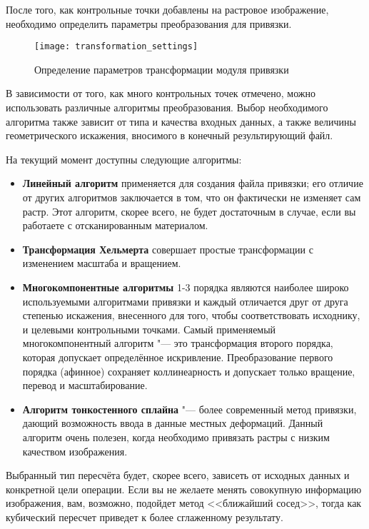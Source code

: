 После того, как контрольные точки добавлены на растровое изображение,
необходимо определить параметры преобразования для привязки.

\begin{figure}[ht]
\centering
  \texttt{[image: transformation\_settings]}
  \caption{Определение параметров трансформации модуля привязки \wincaption}\label{fig:georef_transform}
\end{figure}


В зависимости от того, как много контрольных точек отмечено, можно
использовать различные алгоритмы преобразования. Выбор необходимого
алгоритма также зависит от типа и качества входных данных, а также
величины геометрического искажения, вносимого в конечный результирующий
файл.

На текущий момент доступны следующие алгоритмы:

\begin{itemize}[label=--]
\item \textbf{Линейный алгоритм} применяется для создания файла
привязки; его отличие от других алгоритмов заключается в том, что он
фактически не изменяет сам растр. Этот алгоритм, скорее всего, не будет
достаточным в случае, если вы работаете с отсканированным материалом.
\item \textbf{Трансформация Хельмерта} совершает простые трансформации
с изменением масштаба и вращением.
\item \textbf{Многокомпонентные алгоритмы} 1-3 порядка являются
наиболее широко используемыми алгоритмами привязки и каждый отличается
друг от друга степенью искажения, внесенного для того, чтобы
соответствовать исходнику, и целевыми контрольными точками. Самый
применяемый многокомпонентный алгоритм "--- это трансформация второго
порядка, которая допускает определённое искривление. Преобразование
первого порядка (афинное) сохраняет коллинеарность и допускает только
вращение, перевод и масштабирование.
\item \textbf{Алгоритм тонкостенного сплайна} "--- более современный
метод привязки, дающий возможность ввода в данные местных деформаций.
Данный алгоритм очень полезен, когда необходимо привязать растры с
низким качеством изображения.
\end{itemize}


Выбранный тип пересчёта будет, скорее всего, зависеть от исходных данных
и конкретной цели операции. Если вы не желаете менять совокупную
информацию изображения, вам, возможно, подойдет метод <<ближайший сосед>>,
тогда как кубический пересчет приведет к более сглаженному результату.

